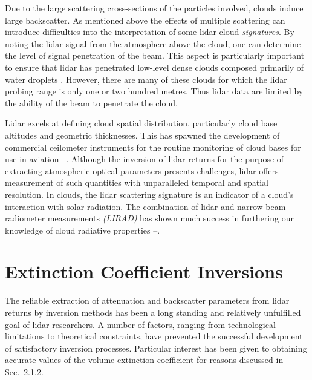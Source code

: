 Due to the large scattering cross-sections of the particles involved,
clouds induce large backscatter. 
As mentioned above the effects of multiple scattering
can introduce difficulties into the interpretation of
some lidar cloud {\em signatures}. 
By noting the lidar signal 
from the atmosphere above the cloud,
one can determine the level of signal 
penetration of the beam.
This aspect is particularly important to 
ensure that lidar has penetrated low-level 
dense clouds composed primarily of water droplets
\cite{agc}\cite{aic2}. However, there are 
many of these clouds for which the lidar
probing range is only one or two hundred metres.
Thus lidar data are limited by the ability of the beam to penetrate 
the cloud.

Lidar excels at defining cloud spatial distribution,
particularly cloud base altitudes and geometric thicknesses.
This has spawned the development of commercial ceilometer instruments
for the routine monitoring of cloud bases for use in aviation
\cite{wle}\nocite{wle2}--\cite{ned}. Although the inversion of 
lidar returns for the purpose of extracting atmospheric optical
parameters presents challenges, lidar offers measurement of such
quantities with unparalleled temporal and spatial resolution.
In clouds, the lidar scattering signature 
is an indicator of a cloud's interaction with solar 
radiation\cite{agc}\cite{drknl}. 
The combination of lidar and narrow beam radiometer
measurements {\em (LIRAD)} has shown much success
in furthering our knowledge of cloud
radiative properties \cite{cmrp1}
\nocite{cmrpacd2}\nocite{cmrph}\nocite{cmrpacd1}\nocite{cmrp2}
\nocite{cmrpjcsacd}--\cite{cmrpjdswdh}.

\section{Extinction Coefficient Inversions}


The reliable extraction of attenuation and backscatter 
parameters from lidar returns by inversion methods has been
a long standing and relatively unfulfilled goal of lidar researchers.
A number of factors, ranging from technological limitations
to theoretical constraints, have prevented the successful 
development of satisfactory inversion processes.
Particular interest has been given to obtaining
accurate values of the volume extinction coefficient
for reasons discussed in Sec.~{2.1.2}.

